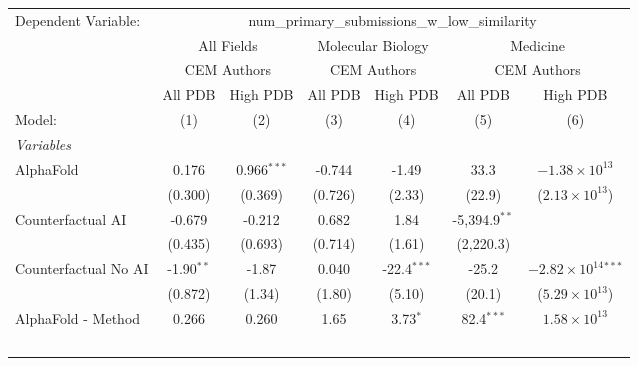 \begingroup
\centering
\begin{tabular}{lcccccc}
   \tabularnewline \midrule \midrule
   Dependent Variable: & \multicolumn{6}{c}{num\_primary\_submissions\_w\_low\_similarity}\\
 & \multicolumn{2}{c}{All Fields} & \multicolumn{2}{c}{Molecular Biology} & \multicolumn{2}{c}{Medicine} \\
\cmidrule(lr){2-3} \cmidrule(lr){4-5} \cmidrule(lr){6-7}
 & \multicolumn{2}{c}{CEM Authors} & \multicolumn{2}{c}{CEM Authors} & \multicolumn{2}{c}{CEM Authors} \\
\cmidrule(lr){2-3} \cmidrule(lr){4-5} \cmidrule(lr){6-7}
 & \multicolumn{1}{c}{All PDB} & \multicolumn{1}{c}{High PDB} & \multicolumn{1}{c}{All PDB} & \multicolumn{1}{c}{High PDB} & \multicolumn{1}{c}{All PDB} & \multicolumn{1}{c}{High PDB} \\
\cmidrule(lr){2-2} \cmidrule(lr){3-3} \cmidrule(lr){4-4} \cmidrule(lr){5-5} \cmidrule(lr){6-6} \cmidrule(lr){7-7}
   Model:                                                     & (1)           & (2)           & (3)       & (4)           & (5)             & (6)\\  
   \midrule
   \emph{Variables}\\
   AlphaFold                                                  & 0.176         & 0.966$^{***}$ & -0.744    & -1.49         & 33.3            & $-1.38\times 10^{13}$\\    
                                                              & (0.300)       & (0.369)       & (0.726)   & (2.33)        & (22.9)          & ($2.13\times 10^{13}$)\\    
   Counterfactual AI                                          & -0.679        & -0.212        & 0.682     & 1.84          & -5,394.9$^{**}$ &   \\   
                                                              & (0.435)       & (0.693)       & (0.714)   & (1.61)        & (2,220.3)       &   \\   
   Counterfactual No AI                                       & -1.90$^{**}$  & -1.87         & 0.040     & -22.4$^{***}$ & -25.2           & $-2.82\times 10^{14}$$^{***}$\\    
                                                              & (0.872)       & (1.34)        & (1.80)    & (5.10)        & (20.1)          & ($5.29\times 10^{13}$)\\    
   AlphaFold - Method                                         & 0.266         & 0.260         & 1.65      & 3.73$^{*}$    & 82.4$^{***}$    & $1.58\times 10^{13}$\\    
$$
\end{tabular}
